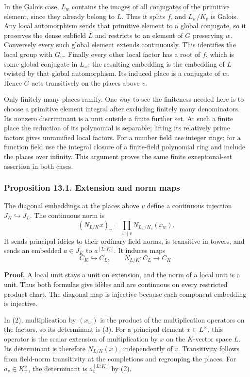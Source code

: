 \documentclass[11pt,a4paper]{article}
\begin{document}
In the Galois case, \(L_w\) contains the images of all conjugates of the
primitive element, since they already belong to \(L\). Thus it splits
\(f\), and \(L_w/K_v\) is Galois. Any local automorphism sends that
primitive element to a global conjugate, so it preserves the dense
subfield \(L\) and restricts to an element of \(G\) preserving \(w\).
Conversely every such global element extends continuously. This
identifies the local group with \(G_w\). Finally every other local
factor has a root of \(f\), which is some global conjugate in \(L_w\);
the resulting embedding is the embedding of \(L\) twisted by that global
automorphism. Its induced place is a conjugate of \(w\). Hence \(G\)
acts transitively on the places above \(v\).

Only finitely many places ramify. One way to see the finiteness needed
here is to choose a primitive element integral after excluding finitely
many denominators. Its nonzero discriminant is a unit outside a finite
further set. At such a finite place the reduction of its polynomial is
separable; lifting its relatively prime factors gives unramified local
factors. For a number field use integer rings; for a function field use
the integral closure of a finite-field polynomial ring and include the
places over infinity. This argument proves the same finite
exceptional-set assertion in both cases.

\subsubsection{Proposition 13.1. Extension and norm
maps}\label{proposition-13.1.-extension-and-norm-maps}

The diagonal embeddings at the places above \(v\) define a continuous
injection \(J_K\hookrightarrow J_L\). The continuous norm is \[
(N_{L/K}x)_v=\prod_{w\mid v}N_{L_w/K_v}(x_w).
\tag{3}
\] It sends principal idèles to their ordinary field norms, is
transitive in towers, and sends an embedded \(a\in J_K\) to
\(a^{[L:K]}\). It induces maps \[
C_K\hookrightarrow C_L,\qquad N_{L/K}:C_L\longrightarrow C_K.
\tag{4}
\]

\textbf{Proof.} A local unit stays a unit on extension, and the norm of
a local unit is a unit. Thus both formulas give idèles and are
continuous on every restricted product chart. The diagonal map is
injective because each component embedding is injective.

In (2), multiplication by \((x_w)\) is the product of the multiplication
operators on the factors, so its determinant is (3). For a principal
element \(x\in L^\times\), this operator is the scalar extension of
multiplication by \(x\) on the \(K\)-vector space \(L\). Its determinant
is therefore \(N_{L/K}(x)\), independently of \(v\). Transitivity
follows from field-norm transitivity at the completions and regrouping
the places. For \(a_v\in K_v^\times\), the determinant is
\(a_v^{[L:K]}\) by (2).
\end{document}
